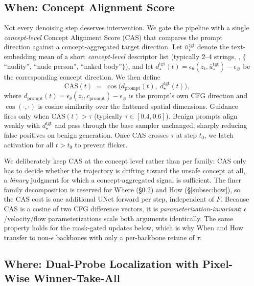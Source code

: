 \subsection{When: Concept Alignment Score}
\label{subsec:when}

Not every denoising step deserves intervention. We gate the pipeline with a single \emph{concept-level} Concept Alignment Score (CAS) that compares the prompt direction against a concept-aggregated target direction. Let $\bar{u}^{\text{tgt}}_{\star}$ denote the text-embedding mean of a short \emph{concept-level} descriptor list (typically 2--4 strings, \eg, $\{$``nudity'', ``nude person'', ``naked body''$\}$), and let $d^{\text{tgt}}_{\star}(t) = \epsilon_\theta(z_t, \bar{u}^{\text{tgt}}_{\star}) - \epsilon_\varnothing$ be the corresponding concept direction. We then define
\begin{equation}
    \mathrm{CAS}(t) \;=\; \cos\!\big(d_{\text{prompt}}(t),\; d^{\text{tgt}}_{\star}(t)\big),
    \label{eq:cas}
\end{equation}
where $d_{\text{prompt}}(t) = \epsilon_\theta(z_t, c_{\text{prompt}}) - \epsilon_\varnothing$ is the prompt's own CFG direction and $\cos(\cdot,\cdot)$ is cosine similarity over the flattened spatial dimensions. Guidance fires only when $\mathrm{CAS}(t) > \tau$ (typically $\tau \in [0.4, 0.6]$). Benign prompts align weakly with $d^{\text{tgt}}_{\star}$ and pass through the base sampler unchanged, sharply reducing false positives on benign generation. Once CAS crosses $\tau$ at step $t_0$, we latch activation for all $t > t_0$ to prevent flicker.

We deliberately keep CAS at the concept level rather than per family: CAS only has to decide whether the trajectory is drifting toward the unsafe concept at all, a \emph{binary} judgment for which a concept-aggregated signal is sufficient. The finer family decomposition is reserved for Where (\S\ref{subsec:where}) and How (\S\ref{subsec:how}), so the CAS cost is one additional UNet forward per step, independent of $F$. Because CAS is a cosine of two CFG difference vectors, it is \emph{parameterization-invariant}: $\epsilon$/velocity/flow parameterizations scale both arguments identically. The same property holds for the mask-gated updates below, which is why When and How transfer to non-$\epsilon$ backbones with only a per-backbone retune of $\tau$.

\subsection{Where: Dual-Probe Localization with Pixel-Wise Winner-Take-All}
\label{subsec:where}

